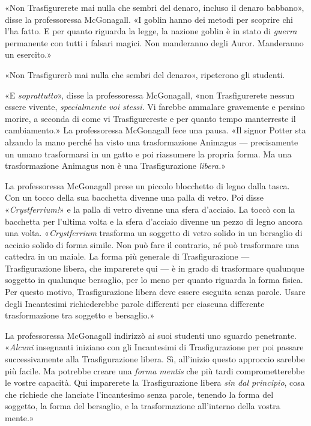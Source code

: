«Non Trasfigurerete mai nulla che sembri del denaro, incluso il denaro babbano», disse la professoressa McGonagall. «I goblin hanno dei metodi per scoprire chi l’ha fatto. E per quanto riguarda la legge, la nazione goblin è in stato di \textit{guerra} permanente con tutti i falsari magici. Non manderanno degli Auror. Manderanno un esercito.»

«Non Trasfigurerò mai nulla che sembri del denaro», ripeterono gli studenti.

«E \textit{soprattutto}», disse la professoressa McGonagall, «non Trasfigurerete nessun essere vivente, \textit{specialmente voi stessi}. Vi farebbe ammalare gravemente e persino morire, a seconda di come vi Trasfigurereste e per quanto tempo manterreste il cambiamento.» La professoressa McGonagall fece una pausa. «Il signor Potter sta alzando la mano perché ha visto una trasformazione Animagus — precisamente un umano trasformarsi in un gatto e poi riassumere la propria forma. Ma una trasformazione Animagus non è una Trasfigurazione \textit{libera.}»

La professoressa McGonagall prese un piccolo blocchetto di legno dalla tasca. Con un tocco della sua bacchetta divenne una palla di vetro. Poi disse «\textit{Crystferrium!}» e la palla di vetro divenne una sfera d’acciaio. La toccò con la bacchetta per l’ultima volta e la sfera d’acciaio divenne un pezzo di legno ancora una volta. «\textit{Crystferrium} trasforma un soggetto di vetro solido in un bersaglio di acciaio solido di forma simile. Non può fare il contrario, né può trasformare una cattedra in un maiale. La forma più generale di Trasfigurazione — Trasfigurazione libera, che imparerete qui — è in grado di trasformare qualunque soggetto in qualunque bersaglio, per lo meno per quanto riguarda la forma fisica. Per questo motivo, Trasfigurazione libera deve essere eseguita senza parole. Usare degli Incantesimi richiederebbe parole differenti per ciascuna differente trasformazione tra soggetto e bersaglio.»

La professoressa McGonagall indirizzò ai suoi studenti uno sguardo penetrante. «\textit{Alcuni} insegnanti iniziano con gli Incantesimi di Trasfigurazione per poi passare successivamente alla Trasfigurazione libera. Sì, all’inizio questo approccio sarebbe più facile. Ma potrebbe creare una \textit{forma mentis} che più tardi comprometterebbe le vostre capacità. Qui imparerete la Trasfigurazione libera \textit{sin dal principio}, cosa che richiede che lanciate l’incantesimo senza parole, tenendo la forma del soggetto, la forma del bersaglio, e la trasformazione all’interno della vostra mente.»

